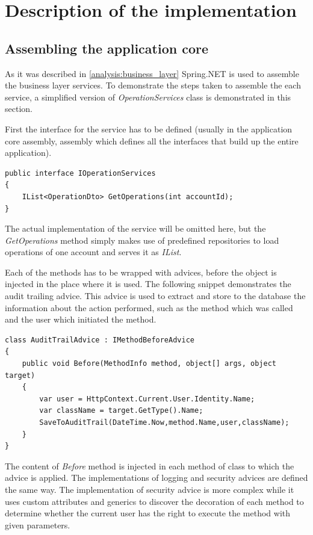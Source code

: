 \chapter{Description of the implementation}

\section{Assembling the application core}
As it was described in \ref{analysis:business_layer} Spring.NET is used to assemble the business layer services. To demonstrate the steps taken to assemble the each service, a simplified version of \textit{OperationServices} class is demonstrated in this section.

First the interface for the service has to be defined (usually in the application core assembly, assembly which defines all the interfaces that build up the entire application).

\begin{verbatim} 
public interface IOperationServices
{
    IList<OperationDto> GetOperations(int accountId);
}
\end{verbatim}

The actual implementation of the service will be omitted here, but the \textit{GetOperations} method simply makes use of predefined repositories to load operations of one account and serves it as \textit{IList}.

Each of the methods has to be wrapped with advices, before the object is injected in the place where it is used. The following snippet demonstrates the audit trailing advice. This advice is used to extract and store to the database the information about the action performed, such as the method which was called and the user which initiated the method.

\begin{verbatim}
class AuditTrailAdvice : IMethodBeforeAdvice
{   
    public void Before(MethodInfo method, object[] args, object target)
    {
        var user = HttpContext.Current.User.Identity.Name;
        var className = target.GetType().Name;
        SaveToAuditTrail(DateTime.Now,method.Name,user,className);   
    }
}
\end{verbatim}
The content of \textit{Before} method is injected in each method of class to which the advice is applied. The implementations of logging and security advices are defined the same way. The implementation of security advice is more complex while it uses custom attributes and generics to discover the decoration of each method to determine whether the current user has the right to execute the method with given parameters.

